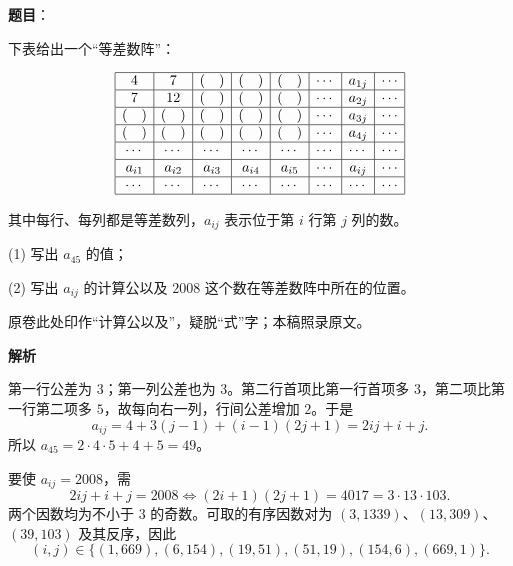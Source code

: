 \begin{answer}

\textbf{题目}：

下表给出一个“等差数阵”：

\nopagebreak[4]
\[
\begin{array}{|c|c|c|c|c|c|c|c|}
\hline
4 & 7 & (\quad) & (\quad) & (\quad) & \cdots & a_{1j} & \cdots \\ \hline
7 & 12 & (\quad) & (\quad) & (\quad) & \cdots & a_{2j} & \cdots \\ \hline
(\quad) & (\quad) & (\quad) & (\quad) & (\quad) & \cdots & a_{3j} & \cdots \\ \hline
(\quad) & (\quad) & (\quad) & (\quad) & (\quad) & \cdots & a_{4j} & \cdots \\ \hline
\cdots & \cdots & \cdots & \cdots & \cdots & \cdots & \cdots & \cdots \\ \hline
a_{i1} & a_{i2} & a_{i3} & a_{i4} & a_{i5} & \cdots & a_{ij} & \cdots \\ \hline
\cdots & \cdots & \cdots & \cdots & \cdots & \cdots & \cdots & \cdots \\ \hline
\end{array}
\]

其中每行、每列都是等差数列，$a_{ij}$ 表示位于第 $i$ 行第 $j$ 列的数。

(1) 写出 $a_{45}$ 的值；

(2) 写出 $a_{ij}$ 的计算公以及 $2008$ 这个数在等差数阵中所在的位置。

\begin{gktip}
原卷此处印作“计算公以及”，疑脱“式”字；本稿照录原文。
\end{gktip}

\textbf{解析}


第一行公差为 $3$；第一列公差也为 $3$。第二行首项比第一行首项多 $3$，第二项比第一行第二项多 $5$，故每向右一列，行间公差增加 $2$。于是
\nopagebreak[4]
\[
a_{ij}=4+3(j-1)+(i-1)(2j+1)=2ij+i+j.
\]
所以 $a_{45}=2\cdot4\cdot5+4+5=49$。


要使 $a_{ij}=2008$，需
\nopagebreak[4]
\[
2ij+i+j=2008\iff(2i+1)(2j+1)=4017=3\cdot13\cdot103.
\]
两个因数均为不小于 $3$ 的奇数。可取的有序因数对为 $(3,1339)$、$(13,309)$、$(39,103)$ 及其反序，因此
\nopagebreak[4]
\[
(i,j)\in\{(1,669),(6,154),(19,51),(51,19),(154,6),(669,1)\}.
\]



\end{answer}